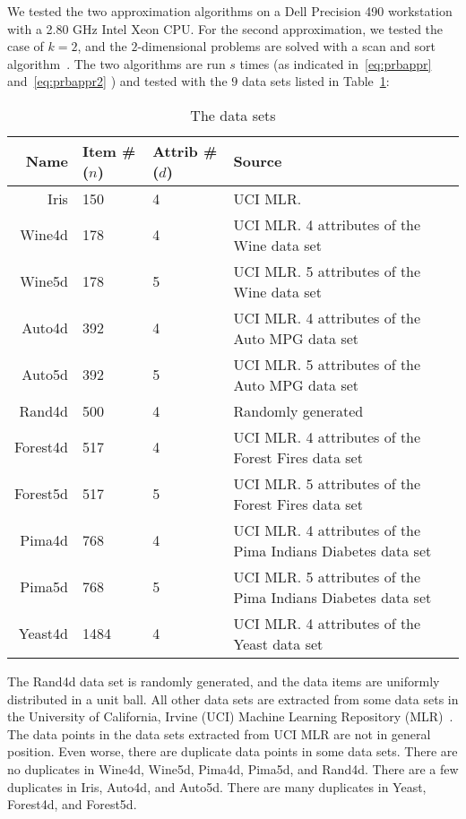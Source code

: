 \documentclass [letterpaper] {article}
\begin{document}
We tested the two approximation algorithms on a Dell Precision 490 workstation with a 2.80 GHz Intel Xeon CPU. For the second approximation, we tested the case of $k=2$, and the $2$-dimensional problems are solved with a scan and sort algorithm~\cite{Rousseeuw98}. The two algorithms are run $s$ times (as indicated in~\eqref{eq:prbappr} and~\eqref{eq:prbappr2} ) and tested with the $9$ data sets listed in Table~\ref{tab:datasets}:
\begin{table}[!htb]
  \centering
  \begin{tabular}[center]{|r|l|l|p{8cm}|}
    \hline
    Name & Item \# ($n$) & Attrib \# ($d$)& Source \\
    \hline
    Iris &  150 & 4 & UCI MLR. \\
    Wine4d &  178 & 4 & UCI MLR. 4 attributes of the Wine data set\\
    Wine5d &  178 & 5 & UCI MLR. 5 attributes of the Wine data set\\
    Auto4d &  392 & 4 & UCI MLR. 4 attributes of the Auto MPG data set\\
    Auto5d &  392 & 5 & UCI MLR. 5 attributes of the Auto MPG data set\\
    Rand4d &  500 & 4 & Randomly generated\\
    Forest4d &  517 & 4 & UCI MLR. 4 attributes of the Forest Fires data set~\cite{Cortez07}\\
    Forest5d &  517 & 5 & UCI MLR. 5 attributes of the Forest Fires data set~\cite{Cortez07}\\
    Pima4d &  768 & 4 & UCI MLR. 4 attributes of the Pima Indians Diabetes data set\\
    Pima5d &  768 & 5 & UCI MLR. 5 attributes of the Pima Indians Diabetes data set\\
    Yeast4d &  1484 & 4 & UCI MLR. 4 attributes of the Yeast data set\\
    \hline
  \end{tabular}
  \caption{The data sets}
  \label{tab:datasets}
\end{table}

The Rand4d data set is randomly generated, and the data items are uniformly distributed in a unit ball. All other data sets are extracted from some data sets in the University of California, Irvine (UCI) Machine Learning Repository (MLR)~\cite{ucimlr07}. 
The data points in the data sets extracted from UCI MLR are not in general position. Even worse, there are duplicate data points in some data sets. There are no duplicates in Wine4d, Wine5d, Pima4d, Pima5d, and Rand4d. There are a few duplicates in Iris, Auto4d, and Auto5d. There are many duplicates in Yeast, Forest4d, and Forest5d.
\end{document}
